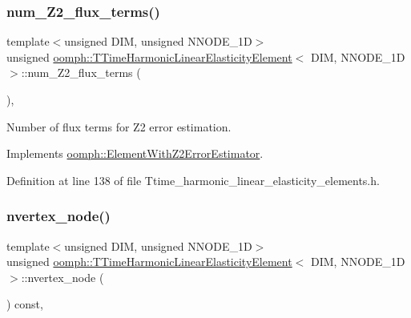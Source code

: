 \subsubsection{\texorpdfstring{num\+\_\+\+Z2\+\_\+flux\+\_\+terms()}{num\_Z2\_flux\_terms()}}
{\footnotesize\ttfamily template$<$unsigned D\+IM, unsigned N\+N\+O\+D\+E\+\_\+1D$>$ \\
unsigned \hyperlink{classoomph_1_1TTimeHarmonicLinearElasticityElement}{oomph\+::\+T\+Time\+Harmonic\+Linear\+Elasticity\+Element}$<$ D\+IM, N\+N\+O\+D\+E\+\_\+1D $>$\+::num\+\_\+\+Z2\+\_\+flux\+\_\+terms (\begin{DoxyParamCaption}{ }\end{DoxyParamCaption})\hspace{0.3cm}{\ttfamily [inline]}, {\ttfamily [virtual]}}



Number of \textquotesingle{}flux\textquotesingle{} terms for Z2 error estimation. 



Implements \hyperlink{classoomph_1_1ElementWithZ2ErrorEstimator_ae82c5728902e13da31be19c390fc28e3}{oomph\+::\+Element\+With\+Z2\+Error\+Estimator}.



Definition at line 138 of file Ttime\+\_\+harmonic\+\_\+linear\+\_\+elasticity\+\_\+elements.\+h.

\mbox{\label{classoomph_1_1TTimeHarmonicLinearElasticityElement_ace9f72ad0f5b88d08f8364a8acc673b0}} 
\subsubsection{\texorpdfstring{nvertex\+\_\+node()}{nvertex\_node()}}
{\footnotesize\ttfamily template$<$unsigned D\+IM, unsigned N\+N\+O\+D\+E\+\_\+1D$>$ \\
unsigned \hyperlink{classoomph_1_1TTimeHarmonicLinearElasticityElement}{oomph\+::\+T\+Time\+Harmonic\+Linear\+Elasticity\+Element}$<$ D\+IM, N\+N\+O\+D\+E\+\_\+1D $>$\+::nvertex\+\_\+node (\begin{DoxyParamCaption}{ }\end{DoxyParamCaption}) const\hspace{0.3cm}{\ttfamily [inline]}, {\ttfamily [virtual]}}



